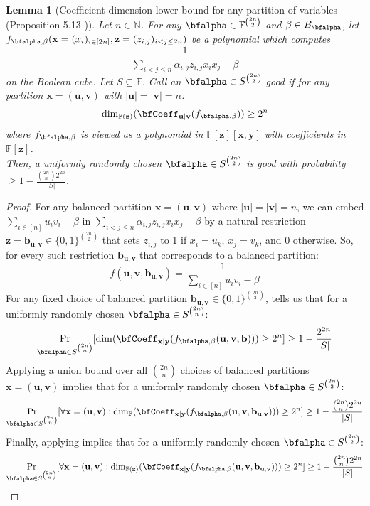 \documentclass[11pt]{article}
\newtheorem{lemma}[theorem]{Lemma}
\newcommand{\Boo}{\{0,1 \}}
\newcommand{\F}{\mathbb{F}}
\newcommand{\comment}[2]{\marginpar{\tiny{\textbf{#1: }\textit{#2}}}}
\newcommand{\vr}[1]{\comment{VR}{#1}}
\newcommand{\ssr}[1]{\comment{SS}{#1}}
\begin{document}
\begin{lemma}[Coefficient dimension lower bound for any partition of variables (Proposition 5.13 \cite{FSTW21})]\label{lem: coeff dim any partition}
    Let $n\in \mathbb{N}$. For any $\bfalpha \in \F^{\binom{2n}{2}}$ and $\beta \in B_{\bfalpha}$, let $f_{\bfalpha,\beta}(\mathbf{x}=(x_i)_{i\in[2n]},\mathbf{z}=(z_{i,j})_{i<j\leq 2n})$ be a polynomial which computes $$\frac{1}{\sum_{i<j\leq n}\alpha_{i,j}z_{i,j}x_ix_j - \beta}$$ on the Boolean cube. Let $S\subseteq \F$. Call an $\bfalpha \in S^{\binom{2n}{2}}$ \emph{good} if for any partition $\mathbf{x} = (\mathbf{u},\mathbf{v})$ with $|\mathbf{u}|=|\mathbf{v}| = n$: $$ \dim_{\F(\mathbf{z})}(\bfCoeff_{\mathbf{u}|\mathbf{v}}(f_{\bfalpha,\beta})) \geq 2^n$$
    where $f_{\bfalpha,\beta}$ is viewed as a polynomial in $\F[\mathbf{z}][\mathbf{x},\mathbf{y}]$ with coefficients in $\F[\mathbf{z}]$. \\
    Then, a uniformly randomly chosen $\bfalpha \in S^{\binom{2n}{2}}$ is good with probability $\geq 1 - \frac{\binom{2n}{n}2^{2n}}{|S|}$.
\end{lemma}
\begin{proof}
    For any balanced partition $\mathbf{x} = (\mathbf{u},\mathbf{v})$ where $|\mathbf{u}| = |\mathbf{v}| = n$, we can embed $\sum_{i\in [n]}u_iv_i - \beta$ in $\sum_{i<j\leq n}\alpha_{i,j}z_{i,j}x_ix_j - \beta$ by a natural restriction $\mathbf{z} = \mathbf{b}_{\mathbf{u},\mathbf{v}} \in \Boo^{\binom{2n}{2}}$ that sets $z_{i,j}$ to 1 if $x_i = u_k$, $x_j = v_k$, and 0 otherwise. So, for every such restriction $\mathbf{b}_{\mathbf{u},\mathbf{v}}$ that corresponds to a balanced partition: $$f(\mathbf{u},\mathbf{v},\mathbf{b}_{\mathbf{u},\mathbf{v}}) = \frac{1}{\sum_{i\in[n]}u_iv_i - \beta}$$
    For any fixed choice of balanced partition $\mathbf{b_{\mathbf{u},\mathbf{v}}}\in\Boo^{\binom{2n}{2}}$,  tells us that for a uniformly randomly chosen $\bfalpha \in S^{\binom{2n}{n}}$: $$ \Pr_{\bfalpha \in S^{\binom{2n}{n}}}[\dim (\bfCoeff_{\mathbf{x}|\mathbf{y}}(f_{\bfalpha,\beta}(\mathbf{u},\mathbf{v},\mathbf{b}))) \geq 2^n] \geq 1-\frac{2^{2n}}{|S|} $$
    Applying a union bound over all $\binom{2n}{n}$ choices of balanced partitions $\mathbf{x} = (\mathbf{u},\mathbf{v})$ implies that for a uniformly randomly chosen $\bfalpha \in S^{\binom{2n}{2}}$: $$ \Pr_{\bfalpha \in S^{\binom{2n}{n}}}[\forall \mathbf{x} = (\mathbf{u},\mathbf{v}): \dim_{\F}(\bfCoeff_{\mathbf{x}|\mathbf{y}}(f_{\bfalpha,\beta}(\mathbf{u},\mathbf{v},\mathbf{b}_{\mathbf{u},\mathbf{v}}))) \geq 2^n] \geq 1-\frac{\binom{2n}{n}2^{2n}}{|S|} $$
    Finally, applying  implies that for a uniformly randomly chosen $\bfalpha \in S^{\binom{2n}{2}}$:
    $$ \Pr_{\bfalpha \in S^{\binom{2n}{n}}}[\forall \mathbf{x} = (\mathbf{u},\mathbf{v}): \dim_{\F(\mathbf{z})}(\bfCoeff_{\mathbf{x}|\mathbf{y}}(f_{\bfalpha,\beta}(\mathbf{u},\mathbf{v},\mathbf{b}_{\mathbf{u},\mathbf{v}}))) \geq 2^n] \geq 1-\frac{\binom{2n}{n}2^{2n}}{|S|} $$
\end{proof}
\end{document}
